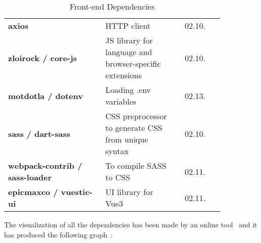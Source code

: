 \begin{table}[h!]
\begin{tabular}{ p{0.45\linewidth} p{0.35\linewidth} r p{0.05\linewidth} }
      \textbf{axios} & HTTP client & 02.10. \\
      
      \addlinespace[0.2cm]
      \midrule
      \addlinespace[0.2cm]
      
      \textbf{zloirock / core-js} & JS library for language and browser-specific extensions & 02.10. \\
      
      \addlinespace[0.2cm]
      \midrule
      \addlinespace[0.2cm]
      
      \textbf{motdotla / dotenv} & Loading .env variables & 02.13. \\
      
      \addlinespace[0.2cm]
      \midrule
      \addlinespace[0.2cm]
      
      \textbf{sass / dart-sass} & CSS preprocessor to generate CSS from unique syntax & 02.10. \\
      
      \addlinespace[0.2cm]
      \midrule
      \addlinespace[0.2cm]
      
      \textbf{webpack-contrib / sass-loader} & To compile SASS to CSS & 02.11. \\
      
      \addlinespace[0.2cm]
      \midrule
      \addlinespace[0.2cm]
      
      \textbf{epicmaxco / vuestic-ui} & UI library for Vue3 & 02.11. \\
      
      \bottomrule
    \end{tabular}
    
    \caption{Front-end Dependencies}
    \label{fig:frontendDependencyTable}
\end{table}

The visualization of all the dependencies has been made by an online tool~\cite{packageLockVisualizer} and it has produced the following graph~\cite{frontendDependencyGraph}:

